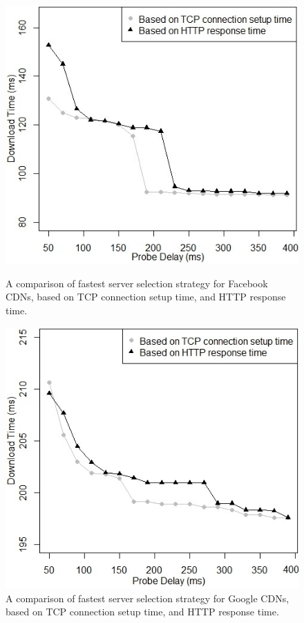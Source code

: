 \documentclass{llncs}
\begin{document}
\begin{figure}
  \includegraphics[width=\linewidth]{figures/server_selection_probe_delay_facebook}
  \caption{A comparison of fastest server selection strategy for Facebook CDNs, based on TCP connection setup time, and HTTP response time.}
  \label{fig:server_selection_probe_delay_facebook}
\endminipage\hfill
{}%
  \includegraphics[width=\linewidth]{figures/server_selection_probe_delay_google}
  \caption{A comparison of fastest server selection strategy for Google CDNs, based on TCP connection setup time, and HTTP response time.}
   \label{fig:server_selection_probe_delay_google}
\endminipage
\end{figure}
\end{document}
